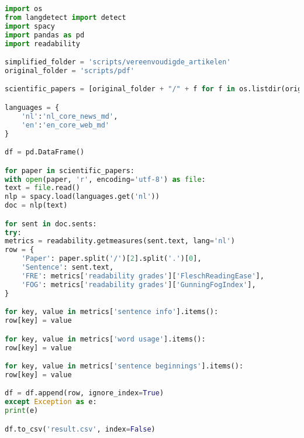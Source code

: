 \begin{center}
	\begin{lstlisting}[language=Python, caption={Script voor fase 4 van de vergelijkende studie}, label={code:verg-studie-phase-4}]
import os
from langdetect import detect
import spacy
import pandas as pd
import readability

simplified_folder = 'scripts/vereenvoudigde_artikelen'
original_folder = 'scripts/pdf'

scientific_papers = [original_folder + "/" + f for f in os.listdir(original_folder)] + [simplified_folder + "/" + f for f in os.listdir(simplified_folder)]

languages = {
	'nl':'nl_core_news_md',
	'en':'en_core_web_md'
}

df = pd.DataFrame()

for paper in scientific_papers:
with open(paper, 'r', encoding='utf-8') as file:
text = file.read()
nlp = spacy.load(languages.get('nl'))
doc = nlp(text)

for sent in doc.sents:
try:
metrics = readability.getmeasures(sent.text, lang='nl')
row = {
	'Paper': paper.split('/')[2].split('.')[0],
	'Sentence': sent.text,
	'FRE': metrics['readability grades']['FleschReadingEase'],
	'FOG': metrics['readability grades']['GunningFogIndex'],
}

for key, value in metrics['sentence info'].items():
row[key] = value

for key, value in metrics['word usage'].items():
row[key] = value

for key, value in metrics['sentence beginnings'].items():
row[key] = value

df = df.append(row, ignore_index=True)
except Exception as e:
print(e)

df.to_csv('result.csv', index=False)
	\end{lstlisting}
\end{center}
